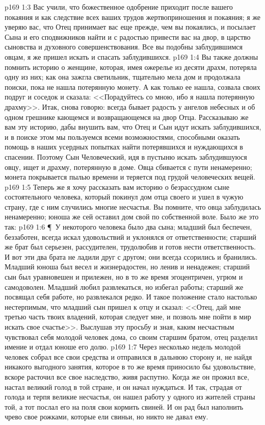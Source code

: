 \vs p169 1:3 Вас учили, что божественное одобрение приходит после вашего покаяния и как следствие всех ваших трудов жертвоприношения и покаяния; я же уверяю вас, что Отец принимает вас еще прежде, чем вы покаялись, и посылает Сына и его сподвижников найти и с радостью привести вас на двор, в царство сыновства и духовного совершенствования. Все вы подобны заблудившимся овцам, я же пришел искать и спасать заблудившихся.
\vs p169 1:4 Вы также должны помнить историю о женщине, которая, имея ожерелье из десяти драхм, потеряла одну из них; как она зажгла светильник, тщательно мела дом и продолжала поиски, пока не нашла потерянную монету. А как только ее нашла, созвала своих подруг и соседок и сказала: <<Порадуйтесь со мною, ибо я нашла потерянную драхму>>. Итак, снова говорю: всегда бывает радость у ангелов небесных и об одном грешнике кающемся и возвращающемся на двор Отца. Рассказываю же вам эту историю, дабы внушить вам, что Отец и Сын идут искать заблудившихся, и в поиске этом мы пользуемся всеми возможностями, способными оказать помощь в наших усердных попытках найти потерявшихся и нуждающихся в спасении. Поэтому Сын Человеческий, идя в пустыню искать заблудившуюся овцу, ищет и драхму, потерянную в доме. Овца сбивается с пути ненамеренно; монета покрывается пылью времени и теряется под грудой человеческих вещей.
\vs p169 1:5 Теперь же я хочу рассказать вам историю о безрассудном сыне состоятельного человека, который  покинул дом отца своего и ушел в чужую страну, где с ним случились многие несчастья. Вы помните, что овца заблудилась ненамеренно; юноша же сей оставил дом свой по собственной воле. Было же это так:
\vs p169 1:6 \P\ У некоторого человека было два сына; младший был беспечен, беззаботен, всегда искал удовольствий и уклонялся от ответственности; старший же брат был серьезен, рассудителен, трудолюбив и готов нести ответственность. И вот эти два брата не ладили друг с другом; они всегда ссорились и бранились. Младший юноша был весел и жизнерадостен, но ленив и ненадежен; старший сын был уравновешен и прилежен, но в то же время эгоцентричен, угрюм и самодоволен. Младший любил развлекаться, но избегал работы; старший же посвящал себя работе, но развлекался редко. И такое положение стало настолько нестерпимым, что младший сын пришел к отцу и сказал: <<Отец, дай мне третью часть твоих владений, которая следует мне, и позволь мне пойти в мир искать свое счастье>>. Выслушав эту просьбу и зная, каким несчастным чувствовал себя молодой человек дома, со своим старшим братом, отец разделил имение и отдал юноше его долю.
\vs p169 1:7 Через несколько недель молодой человек собрал все свои средства и отправился в дальнюю сторону и, не найдя никакого выгодного занятия, которое в то же время приносило бы удовольствие, вскоре расточил все свое наследство, живя распутно. Когда же он прожил все, настал великий голод в той стране, и он начал нуждаться. И так, страдая от голода и терпя великие несчастья, он нашел работу у одного из жителей страны той, а тот послал его на поля свои кормить свиней. И он рад был наполнить чрево свое рожками, которые ели свиньи, но никто не давал ему.
